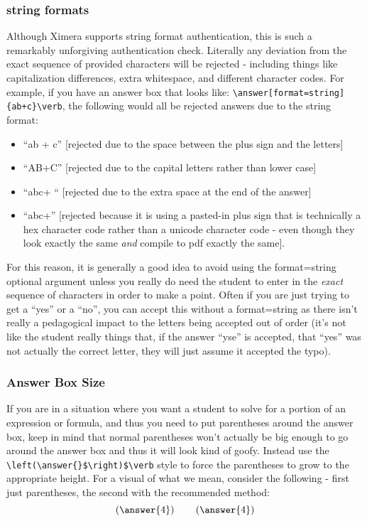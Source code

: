 \documentclass{ximera}
\begin{document}
\subsubsection*{string formats}
Although Ximera supports string format authentication, this is such a
remarkably unforgiving authentication check. Literally any deviation from the
exact sequence of provided characters will be rejected - including things like
capitalization differences, extra whitespace, and different character codes.
For example, if you have an answer box that looks like:
\verb|\answer[format=string]{ab+c}\verb|, the following would all be rejected
answers due to the string format:
\begin{itemize}
  \item ``ab + c'' [rejected due to the space between the plus sign and
        the letters]
  \item ``AB+C'' [rejected due to the capital letters rather than lower
        case]
  \item ``abc+ `` [rejected due to the extra space at the end of the
        answer]
  \item ``abc+'' [rejected because it is using a pasted-in plus sign that
        is technically a hex character code rather than a unicode character
        code - even
        though they look exactly the same \textit{and} compile to pdf exactly
        the
        same].
\end{itemize}
For this reason, it is generally a good idea to avoid using the
format=string optional argument unless you really do need the student to enter
in the \textit{exact} sequence of characters in order to make a point. Often if
you are just trying to get a ``yes'' or a ``no'', you can accept this without a
format=string as there isn't really a pedagogical impact to the letters being
accepted out of order (it's not like the student really things that, if the
answer ``yse'' is accepted, that ``yes'' was not actually the correct letter,
they will just assume it accepted the typo).

\subsubsection*{Answer Box Size}
If you are in a situation where you want a student to solve for a portion
of an expression or formula, and thus you need to put parentheses around the
answer box, keep in mind that normal parentheses won't actually be big enough
to go around the answer box and thus it will look kind of goofy. Instead use
the \verb|\left(\answer{}$\right)$\verb| style to force the parentheses to grow
to the appropriate height. For a visual of what we mean, consider the following
- first just parentheses, the second with the recommended method:
\[
  (\answer{4}) \qquad \left(\answer{4}\right)
\]
\end{document}
